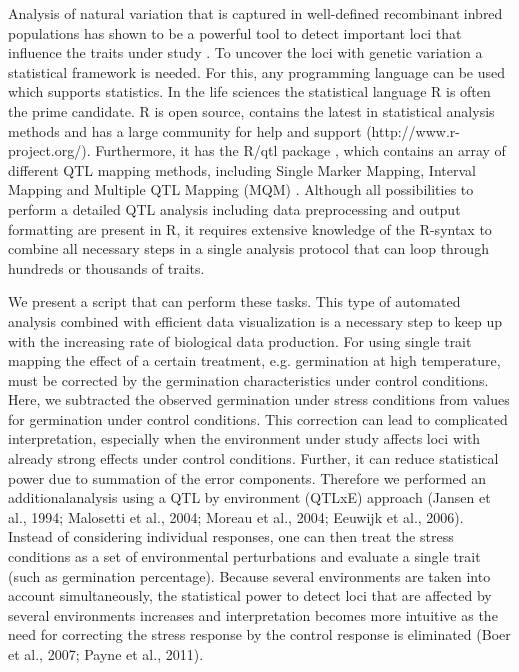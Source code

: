 \documentclass[8pt, twoside, a5paper]{report}
\begin{document}
Analysis of natural variation that is captured in well-defined recombinant inbred populations has shown to be a powerful tool to detect 
important loci that influence the traits under study \cite{Alonso-Blanco:2009}. To uncover the loci with genetic variation a statistical 
framework is needed. For this, any programming language can be used which supports statistics. In the life sciences the statistical language R 
is often the prime candidate. R is open source, contains the latest in statistical analysis methods and has a large community for help 
and support (http://www.r-project.org/). Furthermore, it has the R/qtl package \cite{Broman:2003}, which contains an array of different 
QTL mapping methods, including Single Marker Mapping, Interval Mapping and Multiple QTL Mapping (MQM) \cite{Arends:2010}. Although all 
possibilities to perform a detailed QTL analysis including data preprocessing and output formatting are present in R, it requires extensive
knowledge of the R-syntax to combine all necessary steps in a single analysis protocol that can loop through hundreds or thousands of traits. 

We present a script that can perform these tasks. This type of automated analysis combined with efficient data visualization is a necessary 
step to keep up with the increasing rate of biological data production. For using single trait mapping the effect of a certain treatment, 
e.g. germination at high temperature, must be corrected by the germination characteristics under control conditions. Here, we subtracted the 
observed germination under stress conditions from values for germination under control conditions. This correction can lead to complicated 
interpretation, especially when the environment under study affects loci with already strong effects under control conditions. Further, 
it can reduce statistical power due to summation of the error components. Therefore we performed an additionalanalysis using a QTL by 
environment (QTLxE) approach (Jansen et al., 1994; Malosetti et al., 2004; Moreau et al., 2004; Eeuwijk et al., 2006). Instead of considering 
individual responses, one can then treat the stress conditions as a set of environmental perturbations and evaluate a single trait (such as 
germination percentage). Because several environments are taken into account simultaneously, the statistical power to detect loci that are 
affected by several environments increases and interpretation becomes more intuitive as the need for correcting the stress response by the control
response is eliminated (Boer et al., 2007; Payne et al., 2011).
\end{document}
